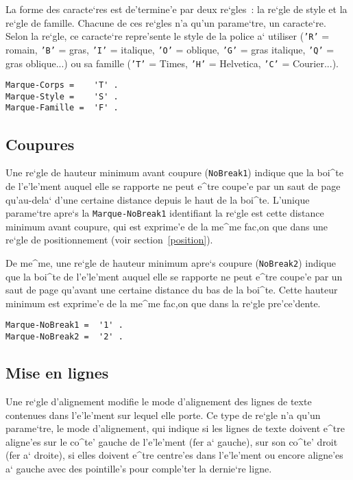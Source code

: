 La forme des caracte`res est de'termine'e par deux re`gles~: la re`gle de style
et la re`gle de famille. Chacune de ces re`gles n'a qu'un parame`tre, un
caracte`re. Selon la re`gle, ce caracte`re repre'sente le style de la police
a` utiliser ({\tt 'R'} = romain, {\tt 'B'} = gras, {\tt 'I'} = italique,
{\tt 'O'} = oblique, {\tt 'G'} = gras italique, {\tt 'Q'} = gras oblique...)
ou sa famille ({\tt 'T'} = Times, {\tt 'H'} = Helvetica, {\tt 'C'} =
Courier...).

\begin{verbatim}
Marque-Corps =    'T' .
Marque-Style =    'S' .
Marque-Famille =  'F' .
\end{verbatim}

\subsection{Coupures}

Une re`gle de hauteur minimum avant coupure ({\tt NoBreak1}) indique que
la boi^te de l'e'le'ment auquel elle se rapporte ne peut e^tre coupe'e par
un saut de page qu'au-dela` d'une certaine distance depuis le haut de la
boi^te. L'unique parame`tre apre`s la {\tt Marque-NoBreak1} identifiant
la re`gle est cette distance minimum avant coupure, qui est exprime'e de
la me^me fac,on que dans une re`gle de positionnement (voir section~\ref{position}).

De me^me, une re`gle de hauteur minimum apre`s coupure ({\tt NoBreak2})
indique que la boi^te de l'e'le'ment auquel elle se rapporte ne peut e^tre
coupe'e par un saut de page qu'avant une certaine distance du bas de la
boi^te. Cette hauteur minimum est exprime'e de la me^me fac,on que dans
la re`gle pre'ce'dente.

\begin{verbatim}
Marque-NoBreak1 =  '1' .
Marque-NoBreak2 =  '2' .
\end{verbatim}

\subsection{Mise en lignes}

Une re`gle d'alignement modifie le mode d'alignement des lignes de texte
contenues dans l'e'le'ment sur lequel elle porte. Ce type de re`gle n'a qu'un
parame`tre, le mode d'alignement, qui indique si les lignes de texte doivent
e^tre aligne'es sur le co^te' gauche de l'e'le'ment (fer a` gauche), sur son co^te'
droit (fer a` droite), si elles doivent e^tre centre'es dans l'e'le'ment ou encore
aligne'es a` gauche avec des pointille's pour comple'ter la dernie`re ligne.

